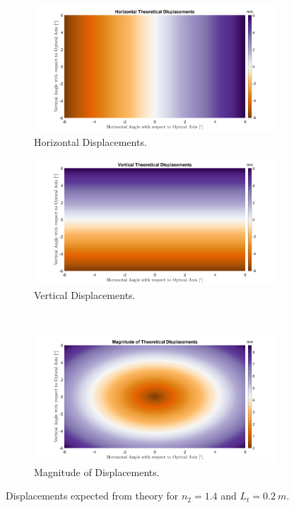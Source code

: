 \documentclass{article}
\begin{document}
\begin{figure}
\begin{subfigure}[b]{.5\linewidth}
\centering \includegraphics[width=\linewidth]{hordispnmax.png}
\caption{Horizontal Displacements.}\label{fig:2a}
\end{subfigure}%
\begin{subfigure}[b]{.5\linewidth}
\centering\large \includegraphics[width=\linewidth]{verdispnmax.png}
\caption{Vertical Displacements.}\label{fig:2b}
\end{subfigure} \\
\begin{subfigure}[b]{\linewidth}
\centering \includegraphics[width=\linewidth]{magndispnmax.png}
\caption{Magnitude of Displacements.}\label{fig:2c}
\end{subfigure}%
\caption{Displacements expected from theory for $n_2 = 1.4$ and $L_t = \SI{0.2}{m}$.}\label{fig:2}
\end{figure}
\end{document}
